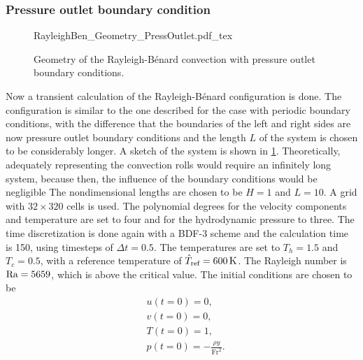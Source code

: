 \subsubsection{Pressure outlet boundary condition}\label{ssec:MultipleCellConv}
\begin{figure}[t!]
	\begin{center}
		\def\svgwidth{0.93\textwidth}
		{RayleighBen_Geometry_PressOutlet.pdf_tex}
		\caption{Geometry of the Rayleigh-Bénard convection with pressure outlet boundary conditions. }
		\label{fig:RayBenGeometry}
	\end{center}
\end{figure}
Now a transient calculation of the Rayleigh-Bénard configuration is done. The configuration is similar to the one described for the case with periodic boundary conditions, with the difference that the boundaries of the left and right sides are now pressure outlet boundary conditions and the length $L$ of the system is chosen to be considerably longer. A sketch of the system is shown in \cref{fig:RayBenGeometry}. Theoretically, adequately representing the convection rolls would require an infinitely long system, because then, the influence of the boundary conditions would be negligible The nondimensional lengths are chosen to be $H=1$ and $L=10$. A grid with $32\times320$ cells is used. The polynomial degrees for the velocity components and temperature are set to four and for the hydrodynamic pressure to three. The time discretization is done again with a BDF-3 scheme and the calculation time is 150, using timesteps of $\Delta t = 0.5$. The temperatures are set to $T_h = 1.5$ and $T_c = 0.5$, with a reference temperature of $\hat T_{\text{ref}} = \SI{600}{\kelvin}$. The Rayleigh number is $\text{Ra} = 5659$, which is above the critical value.
The initial conditions are chosen to be
\begin{subequations} 
	\begin{align}
		&u(t=0) = 0, \\
		&v(t=0) = 0, \\
		&T(t=0) = 1, \\
		&p(t=0) = -\frac{\rho y}{\text{Fr}^2}.
	\end{align}
\end{subequations}


